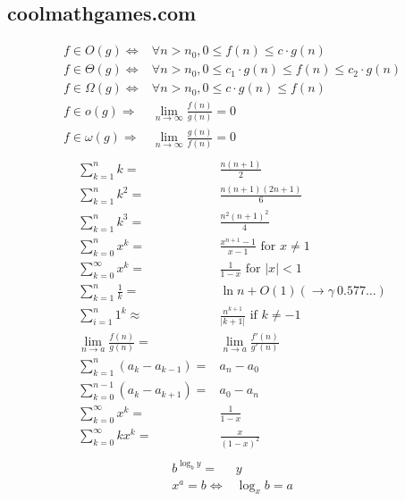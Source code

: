 \documentclass[10pt, a4paper,landscape]{article}
\begin{document}
\begin{multicols*}{4}

\subsection{coolmathgames.com}
\begin{align*}
    f \in O(g) \Leftrightarrow& \forall n > n_0, 0 \leq f(n) \leq c \cdot g(n) \\
    f \in \Theta(g) \Leftrightarrow& \forall n > n_0, 0 \leq c_1 \cdot g(n) \leq f(n) \leq c_2 \cdot g(n) \\
    f \in \Omega(g) \Leftrightarrow& \forall n > n_0, 0 \leq c \cdot g(n) \leq f(n) \\
    f \in o(g) \Rightarrow& \lim_{n \rightarrow \infty} \frac {f(n)} {g(n)} = 0 \\
    f \in \omega(g) \Rightarrow& \lim_{n \rightarrow \infty} \frac {g(n)} {f(n)} = 0 \\
\end{align*}
\begin{align*}
    \sum_{k=1}^{n} k =& \frac{n(n + 1)}{2}\\
    \sum_{k=1}^{n} k^2 =& \frac{n(n + 1)(2n + 1)}{6}\\
    \sum_{k=1}^{n} k^3 =& \frac{n^2 (n + 1)^2}{4}\\
    \sum_{k=0}^{n} x^k =& \frac{x^{n+1} - 1}{x - 1} \text{ for } x \neq 1\\
    \sum_{k=0}^{\infty} x^k =& \frac{1}{1 - x} \text{ for } |x| < 1\\
    \sum_{k=1}^{n} \frac{1}{k} =& \ln n + O(1) (\rightarrow \gamma ~ 0.577 \ldots)\\
    \sum_{i=1}^{n} 1^k \approx& \frac{n^{k +1}}{|k + 1|} \text{ if } k \neq -1\\
    \lim_{n \rightarrow a} \frac{f(n)}{g(n)} =& \lim_{n \rightarrow a} \frac{f'(n)}{g'(n)}\\
    \sum_{k=1}^{n} (a_k - a_{k - 1}) =& a_n - a_0\\
    \sum_{k=0}^{n-1} (a_k- a_{k + 1}) =& a_0 - a_n\\
    \sum_{k=0}^{\infty} x^k =& \frac{1}{1 - x}\\
    \sum_{k=0}^{\infty} kx^k =& \frac{x}{(1 - x)^2}\\
\end{align*}
\begin{align*}
    b^{\log_b y} =& y\\
    x^a = b \Leftrightarrow & \log_x b = a\\

\end{align*}
\end{multicols*}
\end{document}
